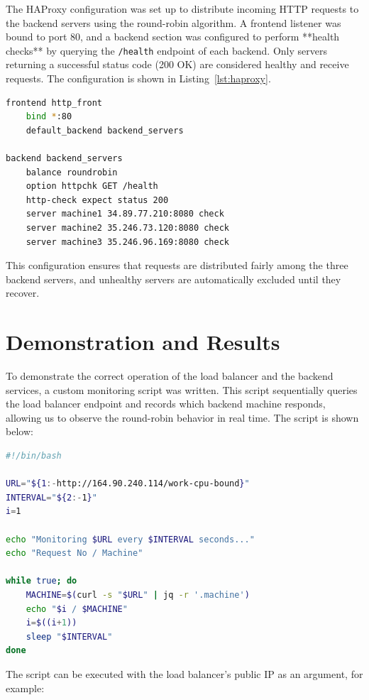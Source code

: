 \documentclass[conference]{IEEEtran}
\begin{document}
The HAProxy configuration was set up to distribute incoming HTTP requests to the backend servers using the round-robin algorithm. A frontend listener was bound to port 80, and a backend section was configured to perform **health checks** by querying the \texttt{/health} endpoint of each backend. Only servers returning a successful status code (200 OK) are considered healthy and receive requests. The configuration is shown in Listing~\ref{lst:haproxy}.

\begin{lstlisting}[language=bash, caption=HAProxy frontend and backend configuration with health checks, label=lst:haproxy]
frontend http_front
    bind *:80
    default_backend backend_servers

backend backend_servers
    balance roundrobin
    option httpchk GET /health
    http-check expect status 200
    server machine1 34.89.77.210:8080 check
    server machine2 35.246.73.120:8080 check
    server machine3 35.246.96.169:8080 check
\end{lstlisting}

This configuration ensures that requests are distributed fairly among the three backend servers, and unhealthy servers are automatically excluded until they recover.

\section{Demonstration and Results}

To demonstrate the correct operation of the load balancer and the backend services, a custom monitoring script was written. This script sequentially queries the load balancer endpoint and records which backend machine responds, allowing us to observe the round-robin behavior in real time. The script is shown below:

\begin{lstlisting}[language=bash, caption=Custom monitoring script for observing backend responses, label=lst:monitor-script]
#!/bin/bash

URL="${1:-http://164.90.240.114/work-cpu-bound}"
INTERVAL="${2:-1}"
i=1

echo "Monitoring $URL every $INTERVAL seconds..."
echo "Request No / Machine"

while true; do
    MACHINE=$(curl -s "$URL" | jq -r '.machine')
    echo "$i / $MACHINE"
    i=$((i+1))
    sleep "$INTERVAL"
done
\end{lstlisting}

The script can be executed with the load balancer's public IP as an argument, for example:
\end{document}

